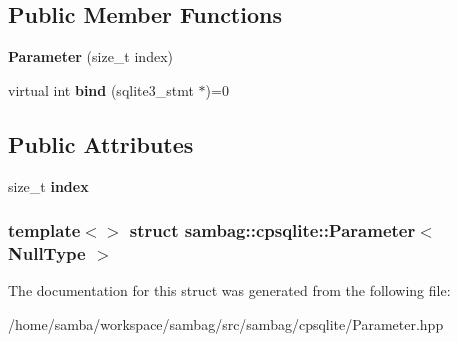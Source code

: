 \subsection*{Public Member Functions}
\begin{DoxyCompactItemize}
\item 
\hypertarget{structsambag_1_1cpsqlite_1_1_parameter_3_01_null_type_01_4_a1ea0b6f9d2697d99e6f2d6531f4bd075}{
{\bfseries Parameter} (size\_\-t index)}
\label{structsambag_1_1cpsqlite_1_1_parameter_3_01_null_type_01_4_a1ea0b6f9d2697d99e6f2d6531f4bd075}

\item 
\hypertarget{structsambag_1_1cpsqlite_1_1_parameter_3_01_null_type_01_4_a6d5826db5309ac05e7f267a4cf9835aa}{
virtual int {\bfseries bind} (sqlite3\_\-stmt $\ast$)=0}
\label{structsambag_1_1cpsqlite_1_1_parameter_3_01_null_type_01_4_a6d5826db5309ac05e7f267a4cf9835aa}

\end{DoxyCompactItemize}
\subsection*{Public Attributes}
\begin{DoxyCompactItemize}
\item 
\hypertarget{structsambag_1_1cpsqlite_1_1_parameter_3_01_null_type_01_4_a0f20eb15a9fa2a94b8ea1274ad76e99f}{
size\_\-t {\bfseries index}}
\label{structsambag_1_1cpsqlite_1_1_parameter_3_01_null_type_01_4_a0f20eb15a9fa2a94b8ea1274ad76e99f}

\end{DoxyCompactItemize}
\subsubsection*{template$<$$>$ struct sambag::cpsqlite::Parameter$<$ NullType $>$}



The documentation for this struct was generated from the following file:\begin{DoxyCompactItemize}
\item 
/home/samba/workspace/sambag/src/sambag/cpsqlite/Parameter.hpp\end{DoxyCompactItemize}
